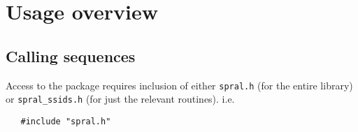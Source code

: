 
\section{Usage overview}

\subsection{Calling sequences}

Access to the package requires inclusion of either \texttt{spral.h} (for the
entire \spral library) or \texttt{spral\_ssids.h} (for just the relevant routines). i.e.

\begin{verbatim}
   #include "spral.h"
\end{verbatim}

